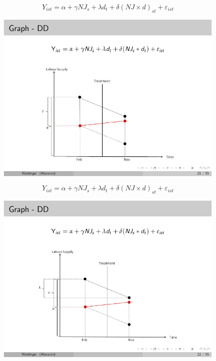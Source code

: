 \documentclass[notes=show]{beamer}
\begin{document}
\begin{frame}[plain]
	$$Y_{ist} = \alpha + \gamma NJ_s + \lambda d_t + \delta(NJ\times d)_{st} + \varepsilon_{ist}$$
	\begin{figure}
	\includegraphics[scale=0.90]{./lecture_includes/waldinger_dd_3.pdf}
	\end{figure}
\end{frame}

\begin{frame}[plain]
	$$Y_{ist} = \alpha + \gamma NJ_s + \lambda d_t + \delta(NJ\times d)_{st} + \varepsilon_{ist}$$
	\begin{figure}
	\includegraphics[scale=0.90]{./lecture_includes/waldinger_dd_4.pdf}
	\end{figure}
\end{frame}
\end{document}
